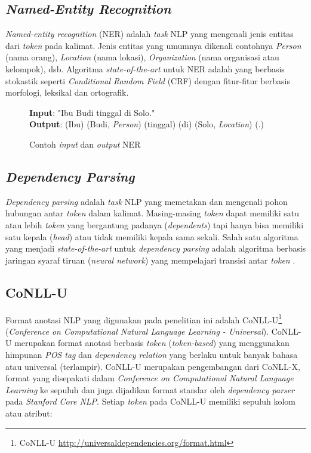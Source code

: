 \subsection{\textit{Named-Entity Recognition}}

\textit{Named-entity recognition} (NER) adalah \textit{task} NLP yang mengenali jenis entitas dari \textit{token} pada kalimat. Jenis entitas yang umumnya dikenali contohnya \textit{Person} (nama orang), \textit{Location} (nama lokasi), \textit{Organization} (nama organisasi atau kelompok), dsb. Algoritma \textit{state-of-the-art} untuk NER adalah yang berbasis stokastik seperti \textit{Conditional Random Field} (CRF) dengan fitur-fitur berbasis morfologi, leksikal dan ortografik.

\begin{figure}
	\begin{mdframed}
		\textbf{Input}: "Ibu Budi tinggal di Solo." \\		
		\textbf{Output}: (Ibu) (Budi, \textit{Person}) (tinggal) (di) (Solo, \textit{Location}) (.)
	\end{mdframed}
	\caption{Contoh \textit{input} dan \textit{output} NER}
	\label{fig:example_ner}
\end{figure}

\subsection{\textit{Dependency Parsing}}

\textit{Dependency parsing} adalah \textit{task} NLP yang memetakan dan mengenali pohon hubungan antar \textit{token} dalam kalimat. Masing-masing \textit{token} dapat memiliki satu atau lebih \textit{token} yang bergantung padanya (\textit{dependents}) tapi hanya bisa memiliki satu kepala (\textit{head}) atau tidak memiliki kepala sama sekali. Salah satu algoritma yang menjadi \textit{state-of-the-art} untuk \textit{dependency parsing} adalah algoritma berbasis jaringan syaraf tiruan (\textit{neural network}) yang mempelajari transisi antar \textit{token} \citep{chen2014fast}. 

\subsection{CoNLL-U}

Format anotasi NLP yang digunakan pada penelitian ini adalah CoNLL-U\footnote{CoNLL-U \url{http://universaldependencies.org/format.html}} (\textit{Conference on Computational Natural Language Learning - Universal}). CoNLL-U merupakan format anotasi berbasis \textit{token} (\textit{token-based}) yang menggunakan himpunan \textit{POS tag} dan \textit{dependency relation} yang berlaku untuk banyak bahasa atau universal \citep{nivre2016universal} (terlampir). CoNLL-U merupakan pengembangan dari CoNLL-X, format yang disepakati dalam \textit{Conference on Computational Natural Language Learning} ke sepuluh dan juga dijadikan format standar oleh \textit{dependency parser} pada \textit{Stanford Core NLP}. Setiap \textit{token} pada CoNLL-U memiliki sepuluh kolom atau atribut:

